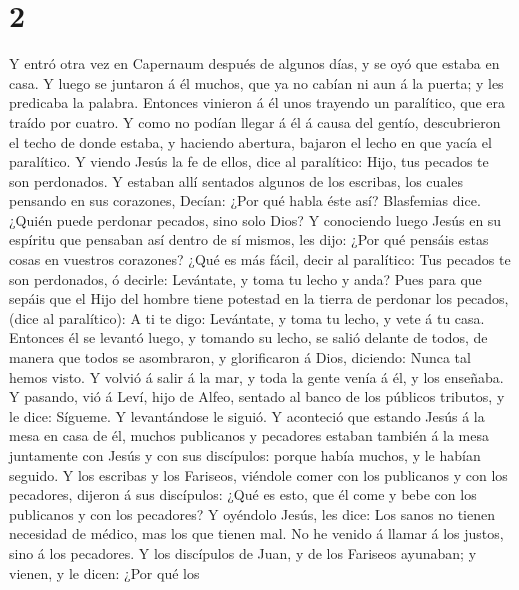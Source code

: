 \hypertarget{section-1}{%
\section{2}\label{section-1}}

 Y entró otra vez en Capernaum después de algunos días, y
se oyó que estaba en casa.  Y luego se juntaron á él
muchos, que ya no cabían ni aun á la puerta; y les predicaba la palabra.
 Entonces vinieron á él unos trayendo un paralítico, que
era traído por cuatro.  Y como no podían llegar á él á
causa del gentío, descubrieron el techo de donde estaba, y haciendo
abertura, bajaron el lecho en que yacía el paralítico.  Y
viendo Jesús la fe de ellos, dice al paralítico: Hijo, tus pecados te
son perdonados.  Y estaban allí sentados algunos de los
escribas, los cuales pensando en sus corazones,  Decían:
¿Por qué habla éste así? Blasfemias dice. ¿Quién puede perdonar pecados,
sino solo Dios?  Y conociendo luego Jesús en su espíritu
que pensaban así dentro de sí mismos, les dijo: ¿Por qué pensáis estas
cosas en vuestros corazones?  ¿Qué es más fácil, decir al
paralítico: Tus pecados te son perdonados, ó decirle: Levántate, y toma
tu lecho y anda?  Pues para que sepáis que el Hijo del
hombre tiene potestad en la tierra de perdonar los pecados, (dice al
paralítico):  A ti te digo: Levántate, y toma tu lecho, y
vete á tu casa.  Entonces él se levantó luego, y tomando
su lecho, se salió delante de todos, de manera que todos se asombraron,
y glorificaron á Dios, diciendo: Nunca tal hemos visto. 
Y volvió á salir á la mar, y toda la gente venía á él, y los enseñaba.
 Y pasando, vió á Leví, hijo de Alfeo, sentado al banco
de los públicos tributos, y le dice: Sígueme. Y levantándose le siguió.
 Y aconteció que estando Jesús á la mesa en casa de él,
muchos publicanos y pecadores estaban también á la mesa juntamente con
Jesús y con sus discípulos: porque había muchos, y le habían seguido.
 Y los escribas y los Fariseos, viéndole comer con los
publicanos y con los pecadores, dijeron á sus discípulos: ¿Qué es esto,
que él come y bebe con los publicanos y con los pecadores?
 Y oyéndolo Jesús, les dice: Los sanos no tienen
necesidad de médico, mas los que tienen mal. No he venido á llamar á los
justos, sino á los pecadores.  Y los discípulos de Juan,
y de los Fariseos ayunaban; y vienen, y le dicen: ¿Por qué los
